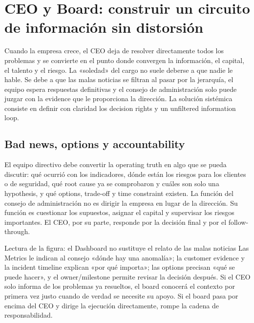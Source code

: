 \section{CEO y Board: construir un circuito de información sin distorsión}

Cuando la empresa crece, el CEO deja de resolver directamente todos los problemas y se convierte en el punto donde convergen la información, el capital, el talento y el riesgo. La «soledad» del cargo no suele deberse a que nadie le hable. Se debe a que las malas noticias se filtran al pasar por la jerarquía, el equipo espera respuestas definitivas y el consejo de administración solo puede juzgar con la evidence que le proporciona la dirección. La solución sistémica consiste en definir con claridad los decision rights y un unfiltered information loop.

\subsection{Bad news, options y accountability}

El equipo directivo debe convertir la operating truth en algo que se pueda discutir: qué ocurrió con los indicadores, dónde están los riesgos para los clientes o de seguridad, qué root cause ya se comprobaron y cuáles son solo una hypothesis, y qué options, trade-off y time constraint existen. La función del consejo de administración no es dirigir la empresa en lugar de la dirección. Su función es cuestionar los supuestos, asignar el capital y supervisar los riesgos importantes. El CEO, por su parte, responde por la decisión final y por el follow-through.


\begin{knowledgebox}{Lectura de la figura: el Dashboard no sustituye el relato de las malas noticias}
Las Metrics le indican al consejo «dónde hay una anomalía»; la customer evidence y la incident timeline explican «por qué importa»; las options precisan «qué se puede hacer», y el owner/milestone permite revisar la decisión después. Si el CEO solo informa de los problemas ya resueltos, el board conocerá el contexto por primera vez justo cuando de verdad se necesite su apoyo. Si el board pasa por encima del CEO y dirige la ejecución directamente, rompe la cadena de responsabilidad.
\end{knowledgebox}


